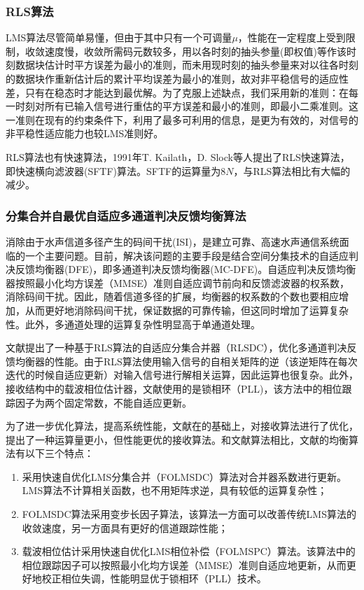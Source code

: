 \subsubsection*{RLS算法}
LMS算法尽管简单易懂，但由于其中只有一个可调量$\mu$，性能在一定程度上受到限制，收敛速度慢，收敛所需码元数较多，用以各时刻的抽头参量(即权值)等作该时刻数据块估计时平方误差为最小的准则，而未用现时刻的抽头参量来对以往各时刻的数据块作重新估计后的累计平均误差为最小的准则，故对非平稳信号的适应性差，只有在稳态时才能达到最优解。为了克服上述缺点，我们采用新的准则：在每一时刻对所有已输入信号进行重估的平方误差和最小的准则，即最小二乘准则。这一准则在现有的约束条件下，利用了最多可利用的信息，是更为有效的，对信号的非平稳性适应能力也较LMS准则好。

RLS算法也有快速算法，1991年T. Kailath，D.
Slock\citep{Cioffi1984,Slock1991,Slock1989,Slock1992,Benallal1989}等人提出了RLS快速算法，即快速横向滤波器(SFTF)算法。SFTF的运算量为$8N$，与RLS算法相比有大幅的减少。
\subsubsection*{分集合并自最优自适应多通道判决反馈均衡算法}
消除由于水声信道多径产生的码间干扰(ISI)，是建立可靠、高速水声通信系统面临的一个主要问题。目前，解决该问题的主要手段是结合空间分集技术的自适应判决反馈均衡器(DFE)，即多通道判决反馈均衡器(MC-DFE)\citep{Geller1996,Capellano1998,Geller1995,stojanovic1993,catipovic1996spatial,Ritcey1992,Gooch1988,Monsen1977,Balaban1992,Stojanvoic1993adaptive}。自适应判决反馈均衡器按照最小化均方误差（MMSE）准则自适应调节前向和反馈滤波器的权系数，消除码间干扰。因此，随着信道多径的扩展，均衡器的权系数的个数也要相应增加，从而更好地消除码间干扰，保证数据的可靠传输，但这同时增加了运算复杂性。此外，多通道处理的运算复杂性明显高于单通道处理。

文献提出了一种基于RLS算法的自适应分集合并器（RLSDC），优化多通道判决反馈均衡器的性能。由于RLS算法使用输入信号的自相关矩阵的逆（该逆矩阵在每次迭代的时候自适应更新）对输入信号进行解相关运算，因此运算也很复杂。此外，接收结构中的载波相位估计器，文献使用的是锁相环（PLL)，该方法中的相位跟踪因子为两个固定常数，不能自适应更新。

为了进一步优化算法，提高系统性能，文献在的基础上，对接收算法进行了优化，提出了一种运算量更小，但性能更优的接收算法。和文献算法相比，文献的均衡算法有以下三个特点：
\begin{enumerate}
    \item
       采用快速自优化LMS分集合并（FOLMSDC）算法对合并器系数进行更新。LMS算法不计算相关函数，也不用矩阵求逆，具有较低的运算复杂性；
   \item
       FOLMSDC算法采用变步长因子算法，该算法一方面可以改善传统LMS算法的收敛速度，另一方面具有更好的信道跟踪性能；
   \item  载波相位估计采用快速自优化LMS相位补偿（FOLMSPC）算法。该算法中的相位跟踪因子可以按照最小化均方误差（MMSE）准则自适应地更新，从而更好地校正相位失调，性能明显优于锁相环（PLL）技术。
\end{enumerate}

